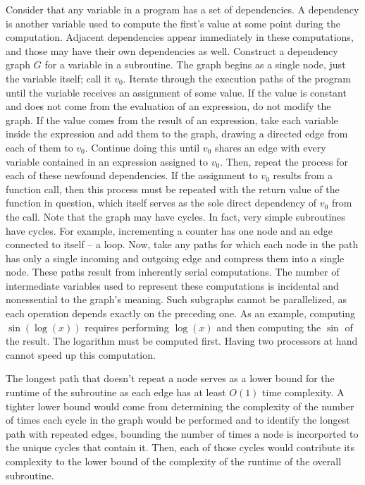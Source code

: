Consider that any variable in a program has a set of dependencies. A dependency
is another variable used to compute the first's value at some point during the
computation. Adjacent dependencies appear immediately in these computations, and
those may have their own dependencies as well. Construct a dependency graph $G$
for a variable in a subroutine. The graph begins as a single node, just the
variable itself; call it $v_0$. Iterate through the execution paths of the
program until the variable receives an assignment of some value. If the value is
constant and does not come from the evaluation of an expression, do not modify
the graph. If the value comes from the result of an expression, take each
variable inside the expression and add them to the graph, drawing a directed
edge from each of them to $v_0$. Continue doing this until $v_0$ shares an edge
with every variable contained in an expression assigned to $v_0$. Then, repeat
the process for each of these newfound dependencies. If the assignment to $v_0$
results from a function call, then this process must be repeated with the return
value of the function in question, which itself serves as the sole direct
dependency of $v_0$ from the call. Note that the graph may have cycles. In fact,
very simple subroutines have cycles. For example, incrementing a counter has one
node and an edge connected to itself -- a loop. Now, take any paths for which
each node in the path has only a single incoming and outgoing edge and compress
them into a single node. These paths result from inherently serial computations.
The number of intermediate variables used to represent these computations is
incidental and nonessential to the graph's meaning. Such subgraphs cannot be
parallelized, as each operation depends exactly on the preceding one. As an
example, computing $\sin(\log(x))$ requires performing $\log(x)$ and then
computing the $\sin$ of the result. The logarithm must be computed first. Having
two processors at hand cannot speed up this computation.

The longest path that doesn't repeat a node serves as a lower bound for the
runtime of the subroutine as each edge has at least $O(1)$ time complexity. A
tighter lower bound would come from determining the complexity of the number
of times each cycle in the graph would be performed and to identify the longest
path with repeated edges, bounding the number of times a node is incorported to
the unique cycles that contain it. Then, each of those cycles would contribute
its complexity to the lower bound of the complexity of the runtime of the
overall subroutine.

